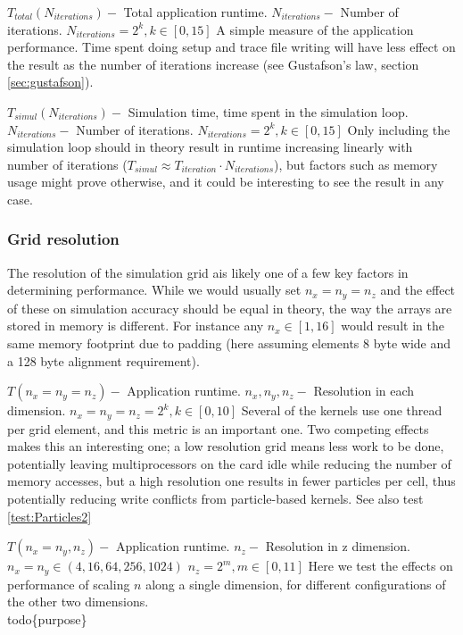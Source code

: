 	{ $T_{total}(N_{iterations}) -$ Total application runtime.}
	{$N_{iterations} -$ Number of iterations.}
	{$N_{iterations} = 2^k, k\in [0,15]$}
	{A simple measure of the application performance. Time spent doing setup and trace file writing will have less effect
	on the result as the number of iterations increase (see Gustafson's law, section \ref{sec:gustafson}).}

	{$T_{simul}(N_{iterations}) -$ Simulation time, time spent in the simulation loop.}
	{$N_{iterations} -$ Number of iterations.}
	{$N_{iterations} = 2^k, k\in [0,15]$}
	{Only including the simulation loop should in theory result in runtime increasing linearly with number of iterations
	($T_{simul} \approx T_{iteration} \cdot N_{iterations}$), but factors such as memory usage might prove otherwise, and
	it could be interesting to see the result in any case.}

\subsubsection{Grid resolution}
The resolution of the simulation grid ais likely one of a few key factors in determining performance. While we would
usually set $n_x = n_y = n_z$ and the effect of these on simulation accuracy should be equal in theory, the way the
arrays are stored in memory is different. For instance any $n_x \in [1,16]$ would result in the same memory footprint
due to padding (here assuming elements 8 byte wide and a 128 byte alignment requirement).

	{$T(n_x = n_y = n_z) -$ Application runtime.}
	{$n_x, n_y, n_z -$ Resolution in each dimension.}
	{$n_x = n_y = n_z = 2^k, k\in [0,10]$}
	{Several of the kernels use one thread per grid element, and this metric is an important one. Two competing effects
	makes this an interesting one; a low resolution grid means less work to be done, potentially leaving multiprocessors on the
	card idle while reducing the number of memory accesses, but a high resolution one results in fewer particles per cell,
	thus potentially reducing write conflicts from particle-based kernels. See also test \ref{test:Particles2}}

	{$T(n_x = n_y, n_z) -$ Application runtime.}
	{$n_z -$ Resolution in z dimension.}
	{$n_x = n_y \in (4, 16, 64, 256, 1024)$\newline
	 $n_z = 2^m, m\in [0,11]$}
	{Here we test the effects on performance of scaling $n$ along a single dimension, for different configurations of the
	other two dimensions. \\todo\{purpose\}}


